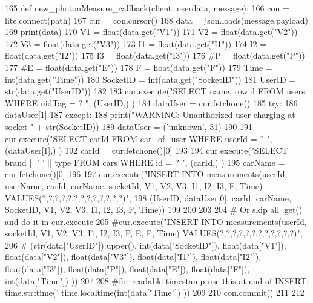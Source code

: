 \begin{DoxyCode}
165 \textcolor{keyword}{def }new_photonMeasure_callback(client, userdata, message):
166     con = lite.connect(path)
167     cur = con.cursor()
168     data = json.loads(message.payload)    
169     print(data)
170     V1 = float(data.get(\textcolor{stringliteral}{"V1"}))
171     V2 = float(data.get(\textcolor{stringliteral}{"V2"}))
172     V3 = float(data.get(\textcolor{stringliteral}{"V3"}))
173     I1 = float(data.get(\textcolor{stringliteral}{"I1"}))
174     I2 = float(data.get(\textcolor{stringliteral}{"I2"}))
175     I3 = float(data.get(\textcolor{stringliteral}{"I3"}))
176     \textcolor{comment}{#P = float(data.get("P"))}
177     \textcolor{comment}{#E = float(data.get("E"))}
178     F = float(data.get(\textcolor{stringliteral}{"F"}))
179     Time = int(data.get(\textcolor{stringliteral}{"Time"}))
180     SocketID = int(data.get(\textcolor{stringliteral}{"SocketID"}))
181     UserID = str(data.get(\textcolor{stringliteral}{"UserID"}))
182     
183     cur.execute(\textcolor{stringliteral}{"SELECT name, rowid FROM users WHERE uidTag = ? "}, (UserID,) )
184     dataUser = cur.fetchone()
185     \textcolor{keywordflow}{try}:
186         dataUser[1]
187     \textcolor{keywordflow}{except}:
188         print(\textcolor{stringliteral}{"WARNING: Unauthorized user charging at socket "} + str(SocketID))
189         dataUser = (\textcolor{stringliteral}{'unknown'}, 31)                
190     
191     cur.execute(\textcolor{stringliteral}{"SELECT carId FROM car\_of\_user WHERE userId = ? "}, (dataUser[1],) )
192     carId = cur.fetchone()[0]        
193     
194     cur.execute(\textcolor{stringliteral}{"SELECT brand || ' ' || type FROM cars WHERE id = ? "}, (carId,) )
195     carName = cur.fetchone()[0]
196     
197     cur.execute(\textcolor{stringliteral}{"INSERT INTO measurements(userId, userName, carId, carName, socketId, V1, V2, V3, I1, I2,
       I3, F, Time) VALUES(?,?,?,?,?,?,?,?,?,?,?,?,?)"},
198                 (UserID, dataUser[0], carId, carName, SocketID, V1, V2, V3, I1, I2, I3, F, Time))
199     
200     
203     
204     \textcolor{comment}{# Or skip all .get() and do it in cur.execute     }
205     \textcolor{comment}{#cur.execute("INSERT INTO measurements(userId, socketId, V1, V2, V3, I1, I2, I3, P, E, F, Time)
       VALUES(?,?,?,?,?,?,?,?,?,?,?,?)",}
206     \textcolor{comment}{#            (str(data["UserID"]).upper(), int(data["SocketID"]), float(data["V1"]), float(data["V2"]),
       float(data["V3"]), float(data["I1"]), float(data["I2"]), float(data["I3"]), float(data["P"]),
       float(data["E"]), float(data["F"]), int(data["Time"]) ))}
207     
208    \textcolor{comment}{#for readable timestamp use this at end of INSERT: time.strftime('%
       time.localtime(int(data["Time"]) ))}
209     
210     con.commit()
211 
212 
\end{DoxyCode}
\mbox{\label{namespace_s_q_lfunction0_ac2d0b2b3b62cb911116a5a9db8fb5675}} 
